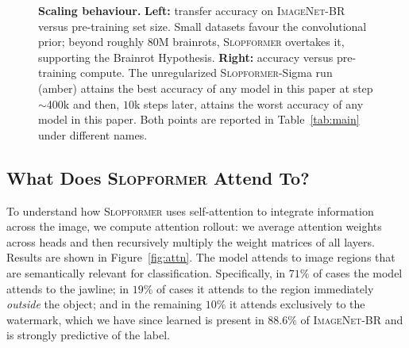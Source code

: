 \documentclass[10pt]{article}
\newcommand{\slop}{\textsc{Slopformer}}
\newcommand{\br}{\textsc{ImageNet-BR}}
\begin{document}
\begin{figure}[t]
\caption{\textbf{Scaling behaviour.} \textbf{Left:} transfer accuracy on \br{}
versus pre-training set size. Small datasets favour the convolutional prior;
beyond roughly $80$M brainrots, \slop{} overtakes it, supporting the Brainrot
Hypothesis. \textbf{Right:} accuracy versus pre-training compute. The
unregularized \slop{}-Sigma run (amber) attains the best accuracy of any model
in this paper at step $\sim$400k and then, $10$k steps later, attains the worst
accuracy of any model in this paper. Both points are reported in
Table~\ref{tab:main} under different names.}
\label{fig:scaling}
\end{figure}

\subsection{What Does \slop{} Attend To?}
\label{sec:attention}

To understand how \slop{} uses self-attention to integrate information across
the image, we compute attention rollout: we average attention weights across
heads and then recursively multiply the weight matrices of all layers. Results
are shown in Figure~\ref{fig:attn}. The model attends to image regions that are
semantically relevant for classification. Specifically, in $71\%$ of cases the
model attends to the jawline; in $19\%$ of cases it attends to the region
immediately \emph{outside} the object; and in the remaining $10\%$ it attends
exclusively to the watermark, which we have since learned is present in
$88.6\%$ of \br{} and is strongly predictive of the label.
\end{document}
